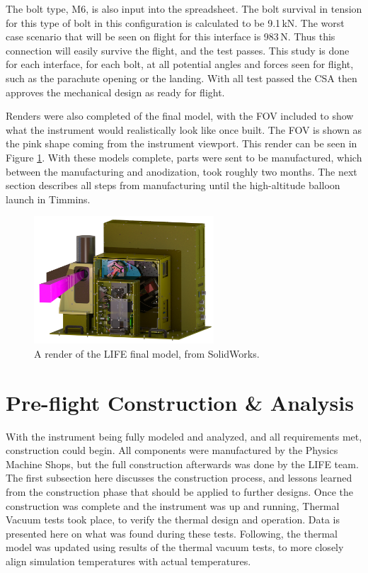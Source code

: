 The bolt type, M6, is also input into the spreadsheet. The bolt survival in tension for this type of bolt in this configuration is calculated to be 9.1\,kN. The worst case scenario that will be seen on flight for this interface is 983\,N. Thus this connection will easily survive the flight, and the test passes. This study is done for each interface, for each bolt, at all potential angles and forces seen for flight, such as the parachute opening or the landing. With all test passed the CSA then approves the mechanical design as ready for flight.

Renders were also completed of the final model, with the FOV included to show what the instrument would realistically look like once built. The FOV is shown as the pink shape coming from the instrument viewport. This render can be seen in Figure \ref{fig:LIFE_FINAL_RENDER}. With these models complete, parts were sent to be manufactured, which between the manufacturing and anodization, took roughly two months. The next section describes all steps from manufacturing until the high-altitude balloon launch in Timmins.

\begin{figure}
    \centering
    \includegraphics[width=0.6\textwidth]{chap3_images/LIFE_V5_final_images/side_view_bbebox.png}
    \caption{A render of the LIFE final model, from SolidWorks.}
    \label{fig:LIFE_FINAL_RENDER}
\end{figure}

\section{Pre-flight Construction \& Analysis}\label{preflight_const_analysis}
With the instrument being fully modeled and analyzed, and all requirements met, construction could begin. All components were manufactured by the Physics Machine Shops, but the full construction afterwards was done by the LIFE team. The first subsection here discusses the construction process, and lessons learned from the construction phase that should be applied to further designs. Once the construction was complete and the instrument was up and running, Thermal Vacuum tests took place, to verify the thermal design and operation. Data is presented here on what was found during these tests. Following, the thermal model was updated using results of the thermal vacuum tests, to more closely align simulation temperatures with actual temperatures. 

